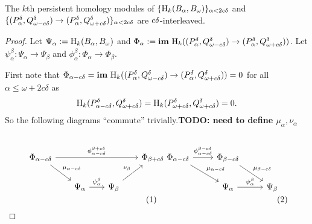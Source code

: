 \begin{lemma}
  The $k$th persistent homology modules of $\{\mathrm{H}_k(B_\alpha, B_{\omega})\}_{\alpha < 2c{\delta}}$ and $\{(P^{{\delta}}_\alpha, Q_{\omega - c{\delta}}^\delta)\to (P^{{\delta}}_\alpha,Q_{\omega + c{\delta}}^\delta)\}_{\alpha < 2c{\delta}}$ are $c{\delta}$-interleaved.
\end{lemma}
\begin{proof}
  Let $\Psi_\alpha := \mathrm{H}_k(B_\alpha, B_{\omega})$ and $\Phi_\alpha := \mathbf{im}~\mathrm{H}_k((P^{{\delta}}_\alpha, Q_{\omega - c{\delta}}^\delta)\to (P^{{\delta}}_\alpha,Q_{\omega + c{\delta}}^\delta))$.
  Let $\psi_\alpha^\beta : \Psi_\alpha\to \Psi_\beta$ and $\phi_\alpha^\beta : \Phi_\alpha\to \Phi_\beta$.

  First note that $\Phi_{\alpha-c\delta} = \mathbf{im}~\mathrm{H}_k((P^{{\delta}}_\alpha, Q_{\omega - c{\delta}}^\delta)\to (P^{{\delta}}_\alpha,Q_{\omega + c{\delta}}^\delta)) = 0$ for all $\alpha\leq \omega+2c\delta$ as
  \[\mathrm{H}_k(P^{{\delta}}_{\alpha-c\delta},Q_{\omega + c{\delta}}^\delta) = \mathrm{H}_k(P^{{\delta}}_{\omega + c\delta}, Q_{\omega + c{\delta}}^{\delta}) = 0.\]
  So the following diagrams ``commute'' trivially.\textbf{TODO: need to define $\mu_\alpha, \nu_\alpha$}

  \vspace{3ex}
  \begin{subequations}
  \begin{minipage}{0.45\textwidth}
  \begin{equation}\label{dgm:intrr1}\begin{tikzcd}[column sep=scriptsize]
    \Phi_{\alpha-c\of}  \arrow[to=Fb, "\phi_{\alpha-c\of}^{\beta+c\of}"]
                      \arrow[to=Ga, "\mu_{\alpha-c\of}"]
    & & & |[alias=Fb]|
      \Phi_{\beta+c\of} \\
    & |[alias=Ga]|
    \Psi_\alpha \arrow[to=Gb, "\psi_\alpha^\beta"]
    & |[alias=Gb]|
      \Psi_\beta \arrow[to=Fb, "\nu_\beta"] &
  \end{tikzcd}\end{equation}
  \end{minipage} \begin{minipage}{0.45\textwidth}
  \begin{equation}\label{dgm:intrr3}\begin{tikzcd}
    \Phi_{\alpha-c\of}  \arrow[to=Fb, "\phi_{\alpha-c\of}^{\beta-c\of}"]
                      \arrow[to=Ga, "\mu_{\alpha-c\of}"]
    & |[alias=Fb]|
      \Phi_{\beta-c\of} \arrow[to=Gb, "\mu_{\beta -c\of}"] \\
    & |[alias=Ga]|
    \Psi_\alpha \arrow[to=Gb, "\psi_\alpha^\beta"]
    & |[alias=Gb]|
      \Psi_\beta
  \end{tikzcd}\end{equation}
  \end{minipage}
  \end{subequations}
  \vspace{3ex}


\end{proof}
